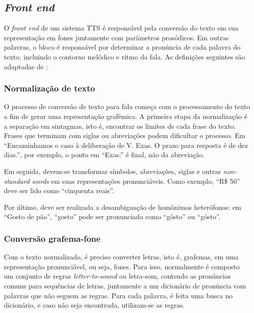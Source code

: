 \subsection{\emph{Front end}}
O \emph{front end} de um sistema TTS é responsável pela conversão do texto em
sua representação em fones juntamente com parâmetros prosódicos. Em outras
palavras, o bloco é responsável por determinar a pronúncia de cada palavra do
texto, incluindo o contorno melódico e ritmo da fala. As definições seguintes
são adaptadas de \cite{martinjurafsky}:

\subsubsection{Normalização de texto}
O processo de conversão de texto para fala começa com o processamento do texto a
fim de gerar uma representação grafêmica. A primeira etapa da normalização é a
separação em sintagmas, isto é, encontrar os limites de cada frase do texto.
Frases que terminam com siglas ou abreviações podem dificultar o processo. Em
``Encaminhamos o caso à deliberação de V. Exas. O prazo para resposta é de dez
dias.'', por exemplo, o ponto em ``Exas.'' é final, não da abreviação.

Em seguida, devem-se transformar símbolos, abreviações, siglas e outras
\emph{non-standard words} em suas representações pronunciáveis. Como exemplo, ``R\$
50'' deve ser lido como ``cinquenta reais''.

Por último, deve ser realizada a desambiguação de homônimos heterófonos: em
``Gosto de pão'', ``gosto'' pode ser pronunciada como ``gôsto'' ou ``gósto''.

\subsubsection{Conversão grafema-fone}
Com o texto normalizado, é preciso converter letras, isto é, grafemas, em uma
representação pronunciável, ou seja, fones. Para isso, normalmente é composto um
conjunto de regras \emph{letter-to-sound} ou letra-som, contendo as pronúncias
comuns para sequências de letras, juntamente a um dicionário de pronúncia com
palavras que não seguem as regras. Para cada palavra, é feita uma busca no
dicionário, e caso não seja encontrada, utilizam-se as regras.

